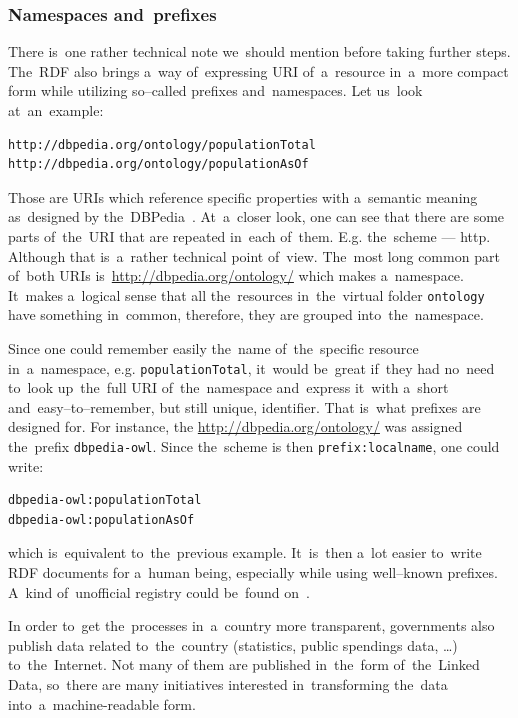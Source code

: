 \subsubsection{Namespaces and~prefixes}

There is~one rather technical note we~should mention before taking further steps. The~RDF
also brings a~way of~expressing URI of~a~resource in~a~more compact form while utilizing
so--called prefixes and~namespaces. Let us~look at~an~example:

\scriptsize\begin{verbatim}
http://dbpedia.org/ontology/populationTotal
http://dbpedia.org/ontology/populationAsOf
\end{verbatim}\normalsize

Those are URIs which reference specific properties with a~semantic meaning as~designed
by the~DBPedia~\cite{dbpedia}. At~a~closer look, one can see that there are some parts of~the~URI
that are repeated in~each of~them. E.g. the~scheme --- http. Although that is~a~rather technical
point of~view. The~most long common part of~both URIs is~\url{http://dbpedia.org/ontology/}
which makes a~namespace. It~makes a~logical sense that all the~resources in~the~virtual
folder \texttt{ontology} have something in~common, therefore, they are grouped into~the~namespace.

\begin{sloppypar}
Since one could remember easily the~name of~the~specific resource in~a~namespace,
e.g. \texttt{populationTotal}, it~would be~great if~they had no~need to~look up~the~full
URI of~the~namespace and~express it~with a~short and~easy--to--remember, but still 
unique, identifier. That is~what prefixes are designed for. For instance, the
\url{http://dbpedia.org/ontology/} was assigned the~prefix \texttt{dbpedia-owl}. Since the~scheme
is then \texttt{prefix:localname}, one could write:
\end{sloppypar}

\scriptsize\begin{verbatim}
dbpedia-owl:populationTotal
dbpedia-owl:populationAsOf
\end{verbatim}\normalsize

which is~equivalent to~the~previous example. It~is~then a~lot easier to~write RDF
documents for a~human being, especially while using well--known prefixes. A~kind of~unofficial
registry could be~found on~\cite{prefixcc}.

In order to~get the~processes in~a~country more transparent, governments also publish data
related to~the~country (statistics, public spendings data, …) to~the~Internet. Not many of
them are published in~the~form of~the~Linked Data, so~there are many initiatives
interested in~transforming the~data into~a~machine-readable form.

